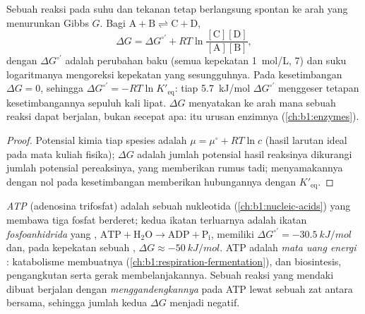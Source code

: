 \begin{proposition}\label{prop:b1:water-small-molecules:gibbs}
Sebuah reaksi pada suhu dan tekanan tetap berlangsung spontan ke arah
yang menurunkan  Gibbs $G$. Bagi
$\mathrm{A} + \mathrm{B} \rightleftharpoons \mathrm{C} + \mathrm{D}$,
\[
\Delta G = \Delta G^{\circ\prime} + RT\ln\frac{[\mathrm{C}][\mathrm{D}]}{[\mathrm{A}][\mathrm{B}]},
\]
dengan $\Delta G^{\circ\prime}$ adalah perubahan  baku
(semua kepekatan \qty{1}{mol/L},  7) dan suku logaritmanya mengoreksi
kepekatan yang sesungguhnya. Pada kesetimbangan $\Delta G = 0$,
sehingga $\Delta G^{\circ\prime} = -RT\ln K'_{\text{eq}}$: tiap
\qty{5.7}{kJ/mol} $\Delta G^{\circ\prime}$ menggeser tetapan
kesetimbangannya sepuluh kali lipat. $\Delta G$ menyatakan ke arah mana
sebuah reaksi dapat berjalan, bukan secepat apa: itu urusan enzimnya
(\cref{ch:b1:enzymes}).
\end{proposition}
\begin{proof}
Potensial kimia tiap spesies adalah $\mu = \mu^\circ + RT\ln c$ (hasil
larutan ideal pada mata kuliah fisika); $\Delta G$ adalah jumlah
potensial hasil reaksinya dikurangi jumlah potensial pereaksinya, yang
memberikan rumus tadi; menyamakannya dengan nol pada kesetimbangan
memberikan hubungannya dengan
$K'_{\text{eq}}$.
\end{proof}

\begin{definition}\label{def:b1:water-small-molecules:atp}
\emph{ATP} (adenosina trifosfat) adalah sebuah nukleotida
(\cref{ch:b1:nucleic-acids}) yang membawa tiga fosfat berderet; kedua
ikatan terluarnya adalah ikatan
\emph{fosfoanhidrida} yang ,
$\mathrm{ATP} + \mathrm{H_2O} \to \mathrm{ADP} +
\mathrm{P_i}$, memiliki $\Delta G^{\circ\prime} = \qty{-30.5}{kJ/mol}$
dan, pada kepekatan sebuah , $\Delta G \approx \qty{-50}{kJ/mol}$.
ATP adalah \emph{mata uang energi} :
katabolisme membuatnya (\cref{ch:b1:respiration-fermentation}), dan
biosintesis, pengangkutan serta gerak membelanjakannya. Sebuah reaksi
yang mendaki dibuat berjalan dengan
\emph{menggandengkannya} pada 
ATP lewat sebuah zat antara bersama, sehingga jumlah kedua $\Delta G$
menjadi negatif.
\end{definition}

